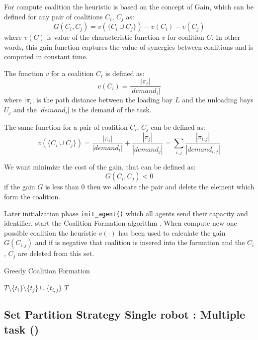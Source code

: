 For compute coalition the heuristic is based on the concept of Gain, which can be 
defined for any pair of coalitions $C_i$, $C_j$ as:
\[G(C_i,C_j) = v(\{C_i \cup C_j\}) - v(C_i) - v(C_j)\]
where $v(C)$ is value of the characteristic function $v$ for coalition $C$. 
In other words, this gain function captures the value of synergies between coalitions
and is computed in constant time.

The function $v$ for a coalition $C_i$ is defined as:
\[ v(C_i) = \frac{|\pi_i|}{|demand_i|}\]
where $|\pi_i|$ is the path distance between the loading bay $L$ and the unloading bays $U_j$
and the $|demand_i|$ is the demand of the task.

The same function for a pair of coalition $C_i$, $C_j$ can be defined as:
\[  v(\{C_i \cup C_j\}) = \frac{|\pi_i|}{|demand_i|} + \frac{|\pi_j|}{|demand_j|} = \sum_{i,j} \frac{|\pi_{i,j}|}{|demand_{i,j}|} \]

We want minimize the cost of the gain, that can be defined as:
\[G(C_i,C_j) < 0 \]
if the gain $G$ is less than 0 then we allocate the pair and delete the element which
form the coalition.

Later initialzation phase \texttt{init\_agent()} which all agents send their capacity and identifier,
start the Coalition Formation algorithm \cite{cf_greedy}.
When compute new one possible coalition the heuristic  $v(\cdot)$ has been used to calculate 
the gain $G(C_{i,j})$ and if is negative that coalition is insered into the formation and the 
$C_i$ , $C_j$ are deleted from this set.

\begin{algorithm}
\caption{Greedy Coalition Formation} \label{GCF}
\begin{algorithmic}[1]
  \State {}
        $T \setminus \{ t_i\} \setminus \{t_j\} \cup \{t_{i,j}\}$
  \EndIf
  \EndIf
\EndFor
\EndFor
{} $T$
\EndProcedure
\end{algorithmic}
\end{algorithm}


\subsection{Set Partition Strategy Single robot : Multiple task (\sps)}

